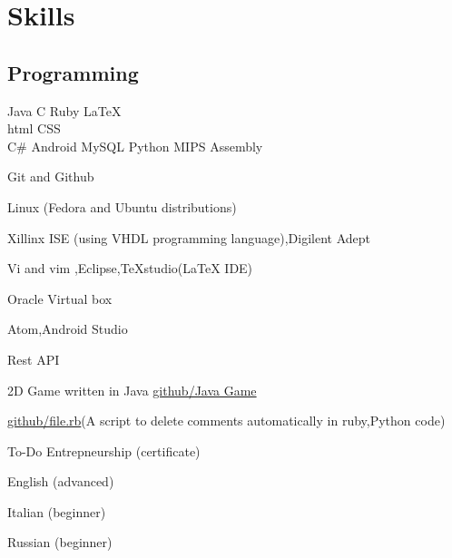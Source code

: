 \documentclass[]{deedy-resume-openfont}
\begin{document}
\begin{minipage}[t]{0.66\textwidth} 

\section{Skills}
\subsection{Programming}
\Large{\textbullet{}Java \Large \textbullet C \textbullet{} Ruby  \textbullet LaTeX}\\[0.1cm]
{\Large	\textbullet{}html \textbullet{} CSS  \\}
	\Large{\textbullet{} {C\#} \textbullet{} Android \textbullet{} MySQL \textbullet{} Python \textbullet{}MIPS Assembly }
          
\sectionsep
          
\sectionsep
          

          
\sectionsep
{}

\begin{tightemize}
	\sectionsep
\item Git and Github   
\item Linux (Fedora and Ubuntu distributions)
\item Xillinx ISE (using VHDL programming language),Digilent Adept
\item {\large Vi and vim} ,Eclipse,TeXstudio(LaTeX IDE)	 
\item Oracle Virtual box
\item Atom,Android Studio
\item Rest API
\end{tightemize}
\sectionsep



\begin{tightemize}
\item 2D Game written in Java \href{https://github.com/umutZeren/Java\_Game}{github/Java Game}\\[0.1cm]
\item \href{https://github.com/umutZeren/Delete\_comments/blob/master/fileManege.rb} {github/file.rb}(A script to delete comments automatically in ruby,Python code)\\[0.1cm]
\item To-Do Entrepneurship (certificate)\\[0.1cm]
\item English (advanced)\\[0.1cm]
\item Italian (beginner)\\[0.1cm]
\item Russian (beginner)\\[0.1cm]
\end{tightemize}
\sectionsep


\end{minipage}
\end{document}
